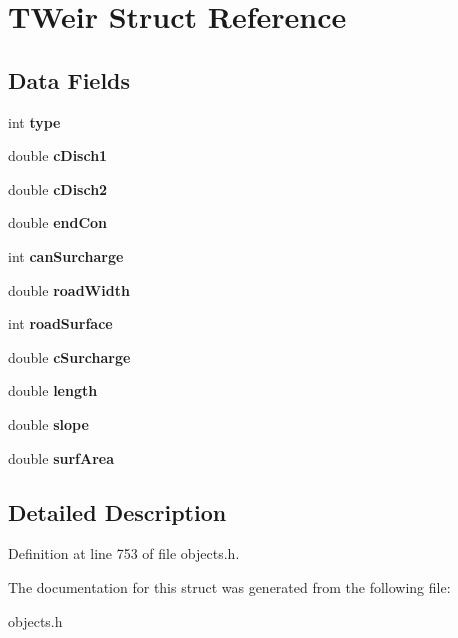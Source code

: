 \hypertarget{struct_t_weir}{}\section{T\+Weir Struct Reference}
\label{struct_t_weir}
\subsection*{Data Fields}
\begin{DoxyCompactItemize}
\item 
\mbox{\label{struct_t_weir_ac765329451135abec74c45e1897abf26}} 
int {\bfseries type}
\item 
\mbox{\label{struct_t_weir_a3851cdd733244e440779d22759b2e8b0}} 
double {\bfseries c\+Disch1}
\item 
\mbox{\label{struct_t_weir_a9124af3826c7453bb1dd12ad06d4ca29}} 
double {\bfseries c\+Disch2}
\item 
\mbox{\label{struct_t_weir_a0a7acb4c505f58c0451a8c9dc6ca8c50}} 
double {\bfseries end\+Con}
\item 
\mbox{\label{struct_t_weir_a1280aa2959afbc5c9bd682e6fa2865a3}} 
int {\bfseries can\+Surcharge}
\item 
\mbox{\label{struct_t_weir_ac67fe8c33e175cd477b150c54aa7a173}} 
double {\bfseries road\+Width}
\item 
\mbox{\label{struct_t_weir_abe4dadef93c56da1cbe1340a31dbdcf9}} 
int {\bfseries road\+Surface}
\item 
\mbox{\label{struct_t_weir_a049426d3de134bc96a11fcd132c0c453}} 
double {\bfseries c\+Surcharge}
\item 
\mbox{\label{struct_t_weir_a928b11f5716331f0b89abe7d8d4124b4}} 
double {\bfseries length}
\item 
\mbox{\label{struct_t_weir_a723974ead8c85a6b9c70c6e018cb64c1}} 
double {\bfseries slope}
\item 
\mbox{\label{struct_t_weir_a18f092e38579e12ec942159bf200580c}} 
double {\bfseries surf\+Area}
\end{DoxyCompactItemize}


\subsection{Detailed Description}


Definition at line 753 of file objects.\+h.



The documentation for this struct was generated from the following file\+:\begin{DoxyCompactItemize}
\item 
objects.\+h\end{DoxyCompactItemize}
